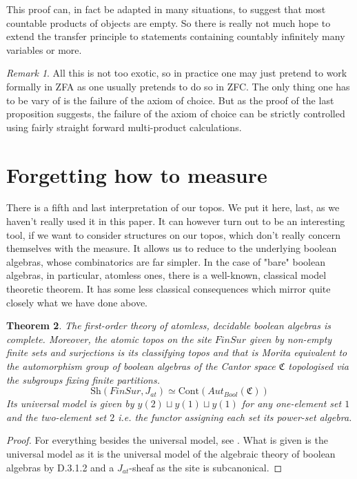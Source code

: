 \documentclass[a4paper]{amsproc}
\theoremstyle{plain}
\newtheorem{theorem}{Theorem}[section]
\theoremstyle{definition}
\theoremstyle{remark}
\newtheorem{remark}[theorem]{Remark}
\numberwithin{equation}{section}
\begin{document}
This proof can, in fact be adapted in many situations, to suggest that most countable products of objects are empty. So there is really not much hope to extend the transfer principle to statements containing countably infinitely many variables or more.
\begin{remark} All this is not too exotic, so in practice one may just pretend to work formally in ZFA as one usually pretends to do so in ZFC. The only thing one has to be vary of is the failure of the axiom of choice. But as the proof of the last proposition suggests, the failure of the axiom of choice can be strictly controlled using fairly straight forward multi-product calculations.
\end{remark}
\section{Forgetting how to measure}
There is a fifth and last interpretation of our topos. We put it here, last, as we haven't really used it in this paper. It can however turn out to be an interesting tool, if we want to consider structures on our topos, which don't really concern themselves with the measure. It allows us to reduce to the underlying boolean algebras, whose combinatorics are far simpler.\newline
\indent In the case of "bare" boolean algebras, in particular, atomless ones, there is a well-known, classical model theoretic theorem. It has some less classical consequences which mirror quite closely what we have done above.
\begin{theorem} The first-order theory of atomless, decidable boolean algebras is complete. Moreover, the atomic topos on the site  $FinSur$ given by non-empty finite sets and surjections is its classifying topos and that is Morita equivalent to the automorphism group of boolean algebras of the Cantor space $\mathfrak{C}$ topologised via the subgroups fixing finite partitions.
\[ \text{Sh}(FinSur, J_{at})\simeq \text{Cont}(Aut_{Bool}(\mathfrak{C}))\]
Its universal model is given by $y(2)\sqcup y(1) \sqcup y(1)$ for any one-element set $1$ and the two-element set $2$ i.e. the functor assigning each set its power-set algebra.
\end{theorem}
\begin{proof} For everything besides the universal model, see \cite{caramello}.  What is given is the universal model as it is the universal model of the algebraic theory of boolean algebras by D.3.1.2 \cite{elephant} and a $J_{at}$-sheaf as the site is subcanonical.
\end{proof}
\end{document}
